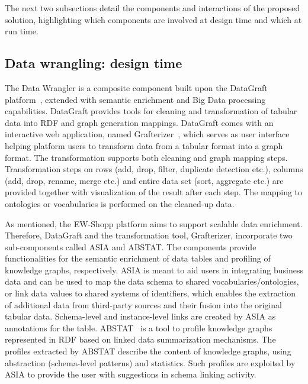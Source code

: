The next two subsections detail the components and interactions of the proposed solution, highlighting which components are involved at design time and which at run time. 


\subsection{Data wrangling: design time}

The Data Wrangler is a composite component built upon the DataGraft platform~\cite{roman2016datagraft}, extended with semantic enrichment and Big Data processing capabilities. DataGraft provides tools for cleaning and transformation of tabular data into RDF and graph generation mappings.
DataGraft comes with an interactive web application, named Grafterizer~\cite{sukhobok2016tabular}, which serves as user interface helping platform users to transform data from a tabular format into a graph format. The transformation supports both cleaning and graph mapping steps. Transformation steps on rows (add, drop, filter, duplicate detection etc.), columns (add, drop, rename, merge etc.) and entire data set (sort, aggregate etc.) are provided together with visualization of the result after each step. The mapping to ontologies or vocabularies is performed on the cleaned-up data. 

As mentioned, the EW-Shopp platform aims to support scalable data enrichment. Therefore, DataGraft and the transformation tool, Grafterizer, incorporate two sub-components called ASIA and ABSTAT. The components provide functionalities for the semantic enrichment of data tables and profiling of knowledge graphs, respectively. ASIA is meant to aid users in integrating business data and can be used to map the data schema to shared vocabularies/ontologies, or link data values to shared systems of identifiers, which enables the extraction of additional data from third-party sources and their fusion into the original tabular data. Schema-level and instance-level links are created by ASIA as annotations for the table. ABSTAT~\cite{palmonari2015abstat} is a tool to profile knowledge graphs represented in RDF based on linked data summarization mechanisms. The profiles extracted by ABSTAT describe the content of knowledge graphs, using abstraction (schema-level patterns) and statistics. Such profiles are exploited by ASIA to provide the user with suggestions in schema linking activity. 


